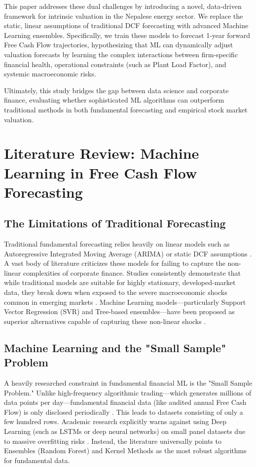 \documentclass[11pt,a4paper]{article}
\begin{document}
This paper addresses these dual challenges by introducing a novel, data-driven framework for intrinsic valuation in the Nepalese energy sector. We replace the static, linear assumptions of traditional DCF forecasting with advanced Machine Learning ensembles. Specifically, we train these models to forecast 1-year forward Free Cash Flow trajectories, hypothesizing that ML can dynamically adjust valuation forecasts by learning the complex interactions between firm-specific financial health, operational constraints (such as Plant Load Factor), and systemic macroeconomic risks. 

Ultimately, this study bridges the gap between data science and corporate finance, evaluating whether sophisticated ML algorithms can outperform traditional methods in both fundamental forecasting and empirical stock market valuation.

\section{Literature Review: Machine Learning in Free Cash Flow Forecasting}

\subsection{The Limitations of Traditional Forecasting}
Traditional fundamental forecasting relies heavily on linear models such as Autoregressive Integrated Moving Average (ARIMA) or static DCF assumptions \cite{damodaran2012}. A vast body of literature criticizes these models for failing to capture the non-linear complexities of corporate finance. Studies consistently demonstrate that while traditional models are suitable for highly stationary, developed-market data, they break down when exposed to the severe macroeconomic shocks common in emerging markets \cite{bekaert2003, fernandez2015}. Machine Learning models---particularly Support Vector Regression (SVR) and Tree-based ensembles---have been proposed as superior alternatives capable of capturing these non-linear shocks \cite{kampouridis2018}.

\subsection{Machine Learning and the "Small Sample" Problem}
A heavily researched constraint in fundamental financial ML is the "Small Sample Problem." Unlike high-frequency algorithmic trading---which generates millions of data points per day---fundamental financial data (like audited annual Free Cash Flow) is only disclosed periodically \cite{gu2020}. This leads to datasets consisting of only a few hundred rows. Academic research explicitly warns against using Deep Learning (such as LSTMs or deep neural networks) on small panel datasets due to massive overfitting risks \cite{krauss2017}. Instead, the literature universally points to Ensembles (Random Forest) and Kernel Methods as the most robust algorithms for fundamental data.
\end{document}
